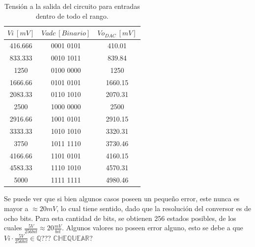 \begin{table}[H]
\centering
\begin{tabular}{ccc}
\toprule
$Vi \ [mV]$ & $Vadc \ [Binario]$ & $Vo_{DAC} \ [mV]$ \\ \midrule
416.666 & 0001 0101 & 410.01 \\
833.333 & 0010 1011 & 839.84 \\
1250 & 0100 0000 & 1250 \\
1666.66 & 0101 0101 & 1660.15 \\
2083.33 & 0110 1010 & 2070.31 \\
2500 & 1000 0000 & 2500 \\
2916.66 & 1001 0101 & 2910.15 \\
3333.33 & 1010 1010 & 3320.31 \\
3750 & 1011 1110 & 3730.46 \\
4166.66 & 1101 0101 & 4160.15 \\
4583.33 & 1110 1010 & 4570.31 \\
5000 & 1111 1111 & 4980.46 \\ \bottomrule
\end{tabular}
\caption{Tensión a la salida del circuito para entradas dentro de todo el rango.}
\end{table}

Se puede ver que si bien algunos casos poseen un pequeño error, este nunca es mayor a $\approx 20mV$, lo cual tiene sentido, dado que la resolución del conversor es de ocho bits. Para esta cantidad de bits, se obtienen 256 estados posibles, de los cuales $\frac{5V}{256bit} \approx 20\frac{mV}{bit}$. Algunos valores no poseen error alguno, esto se debe a que $Vi\cdot \frac{5V}{256bit} \in \mathbb{Q}$??? $\mathbb{CHEQUEAR}$? 

